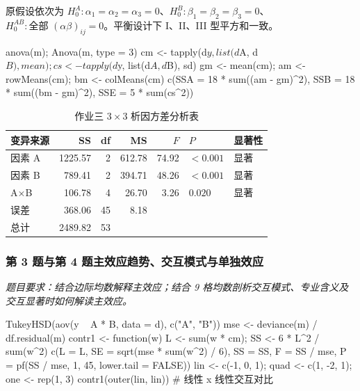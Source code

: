 原假设依次为 $H_0^A:\alpha_1=\alpha_2=\alpha_3=0$、$H_0^B:\beta_1=\beta_2=\beta_3=0$、$H_0^{AB}:\text{全部 }(\alpha\beta)_{ij}=0$。平衡设计下 I、II、III 型平方和一致。

\begin{RCode}
anova(m); Anova(m, type = 3)
cm <- tapply(d$y, list(d$A, d$B), mean); cs <- tapply(d$y, list(d$A, d$B), sd)
gm <- mean(cm); am <- rowMeans(cm); bm <- colMeans(cm)
c(SSA = 18 * sum((am - gm)^2), SSB = 18 * sum((bm - gm)^2), SSE = 5 * sum(cs^2))
\end{RCode}

\begin{table}[htbp]
\centering\small
\caption{作业三 $3\times 3$ 析因方差分析表}
\begin{tabular}{@{}lrrrrll@{}}
\toprule
变异来源 & SS & df & MS & $F$ & $P$ & 显著性\\
\midrule
因素 A          & 1225.57 & 2  & 612.78 & 74.92 & $<0.001$ & 显著\\
因素 B          & 789.41  & 2  & 394.71 & 48.26 & $<0.001$ & 显著\\
A$\times$B      & 106.78  & 4  & 26.70  & 3.26  & $0.020$  & 显著\\
误差            & 368.06  & 45 & 8.18   &       &          & \\
\midrule
总计            & 2489.82 & 53 &        &       &          & \\
\bottomrule
\end{tabular}
\end{table}

\subsubsection*{第 3 题与第 4 题\quad 主效应趋势、交互模式与单独效应}
\emph{题目要求：结合边际均数解释主效应；结合 9 格均数剖析交互模式、专业含义及交互显著时如何解读主效应。}

\begin{RCode}
TukeyHSD(aov(y ~ A * B, data = d), c("A", "B"))
mse <- deviance(m) / df.residual(m)
contr1 <- function(w) {
  L <- sum(w * cm); SS <- 6 * L^2 / sum(w^2)
  c(L = L, SE = sqrt(mse * sum(w^2) / 6), SS = SS, F = SS / mse,
    P = pf(SS / mse, 1, 45, lower.tail = FALSE))
}
lin <- c(-1, 0, 1); quad <- c(1, -2, 1); one <- rep(1, 3)
contr1(outer(lin, lin))                          # 线性 x 线性交互对比
\end{RCode}


